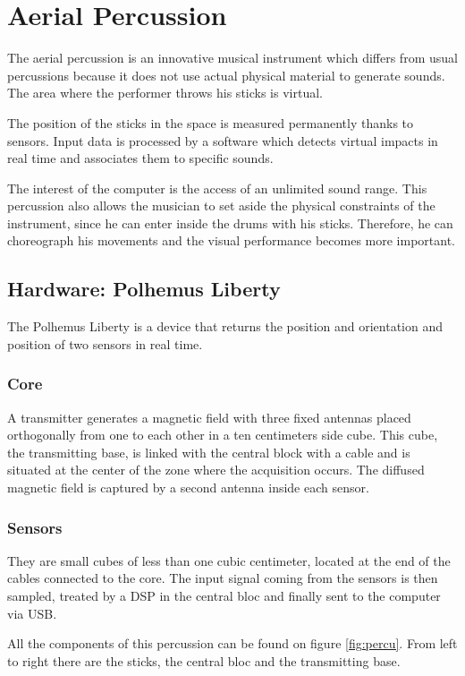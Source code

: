 \section{Aerial Percussion}
The aerial percussion is an innovative musical instrument which differs from usual percussions because it does not use actual physical material to generate sounds. The area where the performer throws his sticks is virtual. 

The position of the sticks in the space is measured permanently thanks to sensors. Input data is processed by a software which detects virtual impacts in real time and associates them to specific sounds. 

The interest of the computer is the access of an unlimited sound range. This percussion also allows the musician to set aside the physical constraints of the instrument, since he can enter inside the drums with his sticks. Therefore, he can choreograph his movements and the visual performance becomes more important.

\subsection{Hardware: Polhemus Liberty}
The Polhemus Liberty is a device that returns the position and orientation and position of two sensors in real time. 

\subsubsection{Core}
A transmitter generates a magnetic field with three fixed antennas placed orthogonally from one to each other in a ten centimeters side cube. This cube, the transmitting base, is linked with the central block with a cable and is situated at the center of the zone where the acquisition occurs. The diffused magnetic field is captured by a second antenna inside each sensor. 

\subsubsection{Sensors}
They are small cubes of less than one cubic centimeter, located at the end of the cables connected to the core. The input signal coming from the sensors is then sampled, treated by a \ac{DSP} in the central bloc and finally sent to the computer via USB.

All the components of this percussion can be found on figure \ref{fig:percu}. From left to right there are the sticks, the central bloc and the transmitting base.

